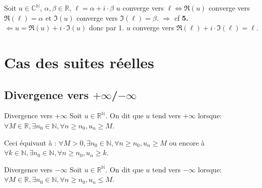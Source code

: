 \documentclass[12pt,a4paper]{report}
\begin{document}
\begin{remarque}
Soit $u \in \mathbb{C}^\mathbb{N}$, $\alpha, \beta \in \mathbb{R}$, $\ell = \alpha + i \cdot \beta$
\newline $u$ converge vers $\ell \Longleftrightarrow \Re(u)$ converge vers $\Re(\ell) = \alpha$ et $\Im(u)$ converge vers $\Im(\ell) = \beta$.
\newline $\Longrightarrow$ cf \textbf{5.}
\newline $\Longleftarrow u = \Re(u) + i \cdot \Im(u)$ donc par 1. $u$ converge vers $\Re(\ell) + i \cdot \Im(\ell) = \ell$.
\end{remarque}


\newpage

\section{Cas des suites réelles}
\subsection{Divergence vers $+\infty$/$-\infty$}

\begin{definition}{Divergence vers $+\infty$}{}
Soit $u \in \mathbb{R}^\mathbb{N}$. On dit que  $u$ tend vers $+\infty$ lorsque:
\newline $\forall M \in \mathbb{R}, \exists n_0 \in \mathbb{N}, \forall n \geq n_0, u_n \geq M$.
\end{definition}

\begin{application}{}{}
Ceci équivaut à : $\forall M > 0, \exists n_0 \in \mathbb{N}, \forall n \geq n_0, u_n \geq M$ ou encore à $\forall k \in \mathbb{N}, \exists n_0 \in \mathbb{N}, \forall n \geq n_0, u_n \geq k$.
\end{application} 

\begin{definition}{Divergence vers $-\infty$}{}
Soit $u \in \mathbb{R}^\mathbb{N}$. On dit que  $u$ tend vers $-\infty$ lorsque:
\newline $\forall M \in \mathbb{R}, \exists n_0 \in \mathbb{N}, \forall n \geq n_0, u_n \leq M$.
\end{definition}
\end{document}
